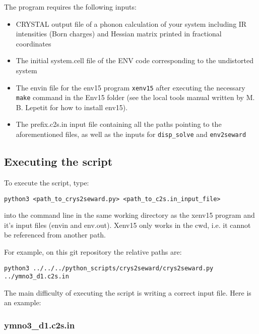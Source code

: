 The program requires the following inputs:

\begin{itemize}
	\item CRYSTAL output file of a phonon calculation of your system including IR intensities (Born charges) and Hessian matrix printed in fractional coordinates
	\item The initial system.cell file of the ENV code corresponding to the undistorted system
	\item The envin file for the env15 program \texttt{xenv15} after executing the necessary \texttt{make} command in the Env15 folder (see the local tools manual written by M. B. Lepetit for how to install env15).
	\item The prefix.c2s.in input file containing all the paths pointing to the aforementioned files, as well as the inputs for \texttt{disp\_solve} and \texttt{env2seward}
\end{itemize}


\subsection{Executing the script}

To execute the script, type:

\texttt{python3 <path\_to\_crys2seward.py> <path\_to\_c2s.in\_input\_file>}

into the command line in the same working directory as the xenv15 program and it's input files (envin and env.out).
Xenv15 only works in the cwd, i.e. it cannot be referenced from another path.

For example, on this git repository the relative paths are:

\texttt{python3 ../../../python\_scripts/crys2seward/crys2seward.py ../ymno3\_d1.c2s.in}

The main difficulty of executing the script is writing a correct input file. Here is an example:

\subsubsection{ymno3\_d1.c2s.in}


